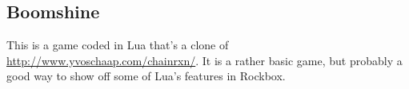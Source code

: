 \subsection{Boomshine}

This is a game coded in Lua that's a clone of \url{http://www.yvoschaap.com/chainrxn/}.
It is a rather basic game, but probably a good way to show off some of Lua's features
in Rockbox.

